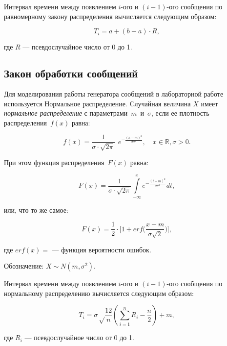 Интервал времени между появлением $i$-ого и $(i - 1)$-ого сообщения по равномерному закону распределения вычисляется следующим образом:

\begin{equation}
	T_{i} = a + (b - a) \cdot R,
\end{equation}

\noindent где $R$ --- псевдослучайное число от 0 до 1.

\subsection*{Закон обработки сообщений}

Для моделирования работы генератора сообщений в лабораторной работе используется Нормальное распределение.
Cлучайная величина $X$ имеет \textit{нормальное распределение} с
параметрами~$m$~и~$\sigma$, если ее плотность распределения~$f(x)$ равна:

\begin{equation}
	f(x) = \frac{1}{\sigma \cdot \sqrt{2\pi}}~~e^{\displaystyle-\frac{(x -
			m)^2}{2\sigma^2}}, \quad x \in \mathbb{R}, \sigma > 0.
\end{equation}

При этом функция распределения~$F(x)$ равна:

\begin{equation}
	F(x) = \frac{1}{\sigma \cdot \sqrt{2\pi}} \int\limits_{-\infty}^{x}
	e^{\displaystyle-\frac{(t - m)^2}{2\sigma^2}} dt,
\end{equation}

или, что то же самое:

\begin{equation}
	F(x) = \frac{1}{2} \cdot \bigg[1 + erf\bigg(\frac{x - m}{\sigma
		\sqrt{2}}\bigg)\bigg],
\end{equation}

где $erf(x) = $ 
 --- функция вероятности
ошибок.

Обозначение: $X \sim N(m, \sigma^2)$. 

Интервал времени между появлением $i$-ого и $(i - 1)$-ого сообщения по нормальному распределению вычисляется следующим образом:

\begin{equation}
	T_i = \sigma \sqrt\frac{12}{n}(\sum\limits_{i=1}^{n} R_i - \frac{n}{2}) + m,
\end{equation}

\noindent где $R_i$ --- псевдослучайное число от 0 до 1.

